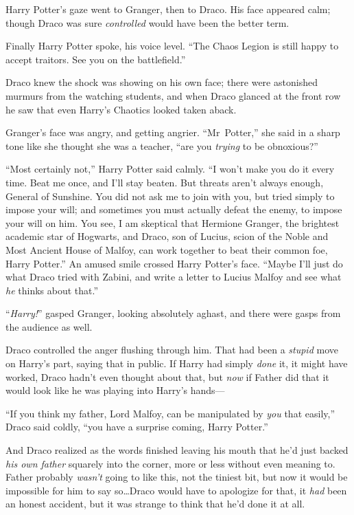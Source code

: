 Harry Potter’s gaze went to Granger, then to Draco. His face appeared calm;
though Draco was sure \emph{controlled} would have been the better term.

Finally Harry Potter spoke, his voice level. “The Chaos Legion is still happy
to accept traitors. See you on the battlefield.”

Draco knew the shock was showing on his own face; there were astonished murmurs
from the watching students, and when Draco glanced at the front row he saw that
even Harry’s Chaotics looked taken aback.

Granger’s face was angry, and getting angrier. “Mr~Potter,” she said in a
sharp tone like she thought she was a teacher, “are you \emph{trying} to be
obnoxious?”

“Most certainly not,” Harry Potter said calmly. “I won’t make you do it every
time. Beat me once, and I’ll stay beaten. But threats aren’t always enough,
General of Sunshine. You did not ask me to join with you, but tried simply to
impose your will; and sometimes you must actually defeat the enemy, to impose
your will on him. You see, I am skeptical that Hermione Granger, the brightest
academic star of Hogwarts, and Draco, son of Lucius, scion of the Noble and
Most Ancient House of Malfoy, can work together to beat their common foe, Harry
Potter.” An amused smile crossed Harry Potter’s face. “Maybe I’ll just do what
Draco tried with Zabini, and write a letter to Lucius Malfoy and see what
\emph{he} thinks about that.”

“\emph{Harry!}” gasped Granger, looking absolutely aghast, and there were gasps
from the audience as well.

Draco controlled the anger flushing through him. That had been a \emph{stupid}
move on Harry’s part, saying that in public. If Harry had simply \emph{done}
it, it might have worked, Draco hadn’t even thought about that, but \emph{now}
if Father did that it would look like he was playing into Harry’s hands—

“If you think my father, Lord Malfoy, can be manipulated by \emph{you} that
easily,” Draco said coldly, “you have a surprise coming, Harry Potter.”

And Draco realized as the words finished leaving his mouth that he’d just
backed \emph{his own father} squarely into the corner, more or less without
even meaning to. Father probably \emph{wasn’t} going to like this, not the
tiniest bit, but now it would be impossible for him to say so…Draco
would have to apologize for that, it \emph{had} been an honest accident, but it
was strange to think that he’d done it at all.

